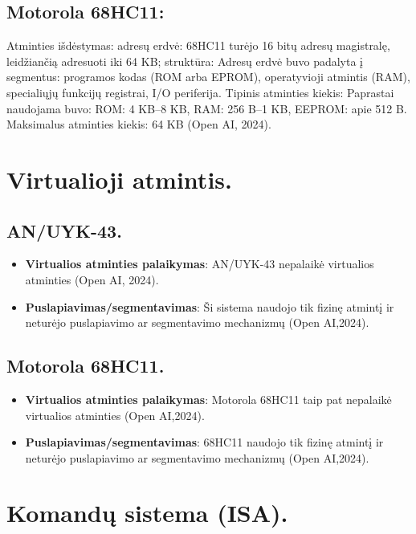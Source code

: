 \documentclass[a4paper,12pt]{article}
\begin{document}
\subsection{Motorola 68HC11:}
Atminties išdėstymas: adresų erdvė: 68HC11 turėjo 16 bitų adresų magistralę, leidžiančią adresuoti iki 64 KB; struktūra: Adresų erdvė buvo padalyta į segmentus: programos kodas (ROM arba EPROM), operatyvioji atmintis (RAM), specialiųjų funkcijų registrai, I/O periferija.
Tipinis atminties kiekis: Paprastai naudojama buvo: ROM: 4 KB–8 KB, RAM: 256 B–1 KB, EEPROM: apie 512 B. Maksimalus atminties kiekis: 64 KB (Open AI, 2024).

\section{Virtualioji atmintis.}
\subsection{AN/UYK-43.}
\begin{itemize}
    \item \textbf{Virtualios atminties palaikymas}: AN/UYK-43 nepalaikė virtualios atminties (Open AI, 2024).
    \item \textbf{Puslapiavimas/segmentavimas}: Ši sistema naudojo tik fizinę atmintį ir neturėjo puslapiavimo ar segmentavimo mechanizmų (Open AI,2024).
\end{itemize}
\subsection{Motorola 68HC11.}
\begin{itemize}
    \item \textbf{Virtualios atminties palaikymas}: Motorola 68HC11 taip pat nepalaikė virtualios atminties (Open AI,2024).
    \item \textbf{Puslapiavimas/segmentavimas}: 68HC11 naudojo tik fizinę atmintį ir neturėjo puslapiavimo ar segmentavimo mechanizmų (Open AI,2024).
\end{itemize}

\section{Komandų sistema (ISA).}
\end{document}
